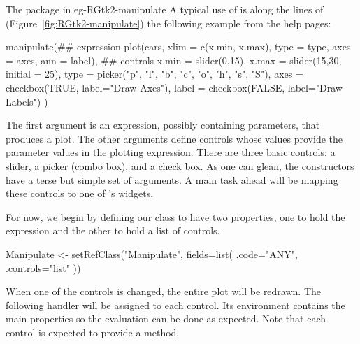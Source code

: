 \begin{example}{The  package in }{eg-RGtk2-manipulate}
A typical use of  is along the lines of
(Figure~\ref{fig:RGtk2-manipulate}) the following example from the
 help pages:
\begin{Schunk}
\begin{Sinput}
 manipulate(## expression
            plot(cars, xlim = c(x.min, x.max), type = type, 
                 axes = axes, ann = label),
            ## controls
            x.min = slider(0,15),
            x.max = slider(15,30, initial = 25),
            type = picker("p", "l", "b", "c", "o", "h", "s", "S"),
            axes = checkbox(TRUE, label="Draw Axes"),
            label = checkbox(FALSE, label="Draw Labels")
            )
\end{Sinput}
\end{Schunk}
%
The first argument is an expression, possibly containing parameters,
that produces a plot. The other arguments define controls whose values
provide the parameter values in the plotting expression. There are
three basic controls: a slider, a picker (combo box), and a check
box. As one can glean, the constructors have a terse but simple set
of arguments. A main task ahead will be mapping these controls to one
of \GTK's widgets.

For now, we begin by defining our  class to have two
properties, one to hold the expression and the other to hold a list of controls.
\begin{Schunk}
\begin{Sinput}
 Manipulate <- setRefClass("Manipulate",
                           fields=list(
                             .code="ANY",
                             .controls="list"
                             ))
\end{Sinput}
\end{Schunk}
%



When one of the controls is changed, the entire plot will be
redrawn. The following handler will be assigned to each control. Its
environment contains the main properties so the evaluation can be done
as expected. Note that each control is expected to provide a
 method.

\begin{Schunk}
\end{Schunk}
%


\end{example}
